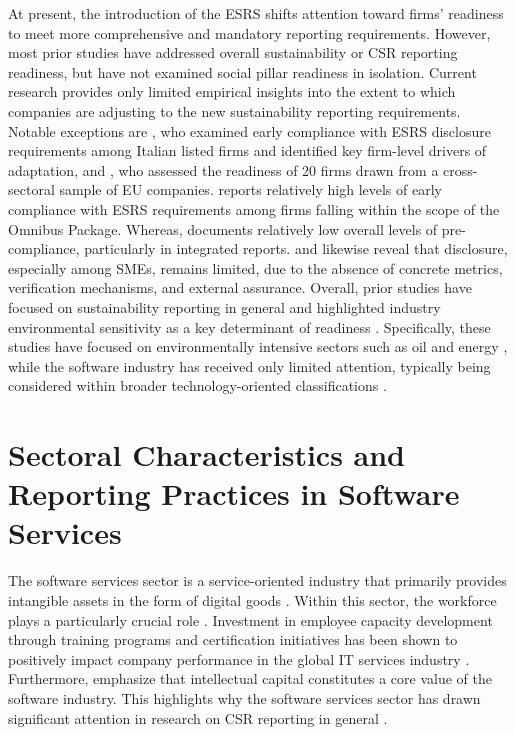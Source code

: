 At present, the introduction of the ESRS shifts attention toward firms' readiness to 
meet more comprehensive and mandatory reporting requirements. However, most prior studies 
have addressed overall sustainability or CSR reporting readiness,
but have not examined social pillar readiness in isolation. Current research provides only 
limited empirical insights into the extent to which companies are adjusting to the new 
sustainability reporting requirements. Notable exceptions are \textcite{Nicolo2025}, who examined early compliance with 
ESRS disclosure requirements among Italian listed firms and identified key firm-level drivers of 
adaptation, and \textcite{Filho2025}, who assessed the readiness of 20 firms drawn from a cross-sectoral 
sample of EU companies. \textcite{Nicolo2025} reports relatively high levels of early compliance 
with ESRS requirements among firms falling within the scope of the Omnibus Package. Whereas, 
\textcite{Raimo2025} documents relatively low overall levels of pre-compliance, 
particularly in integrated reports. \textcite{Filho2025} and \textcite{Montero2025} likewise reveal 
that disclosure, especially among SMEs, remains limited, due to the absence of concrete metrics, 
verification mechanisms, and external assurance. Overall, prior studies have focused on 
sustainability reporting in general and highlighted industry environmental sensitivity 
as a key determinant of readiness \parencite{Filho2025, Raimo2025, Nicolo2025, Montero2025}.
Specifically, these studies have focused on environmentally intensive sectors such as oil and 
energy \parencite{Filho2025, Raimo2025, Nicolo2025}, while the software industry has received 
only limited attention, typically being considered within broader technology-oriented 
classifications \parencite{Montero2025}.

\section{Sectoral Characteristics and Reporting Practices in Software Services}

The software services sector is a service-oriented industry that primarily provides intangible assets 
in the form of digital goods \parencite{Buxmann2015}. Within this sector, the workforce plays a particularly 
crucial role \parencite{Buxmann2015}. Investment in employee capacity development through training programs 
and certification initiatives has been shown to positively impact company performance in the global IT 
services industry \parencite{Chatterjee2017}. Furthermore, \textcite{Nowak2000} emphasize that intellectual 
capital constitutes a core value of the software industry. This highlights why the software services sector 
has drawn significant attention in research on CSR reporting in general \parencite{Holder-Webb2009, Kim2018}.


